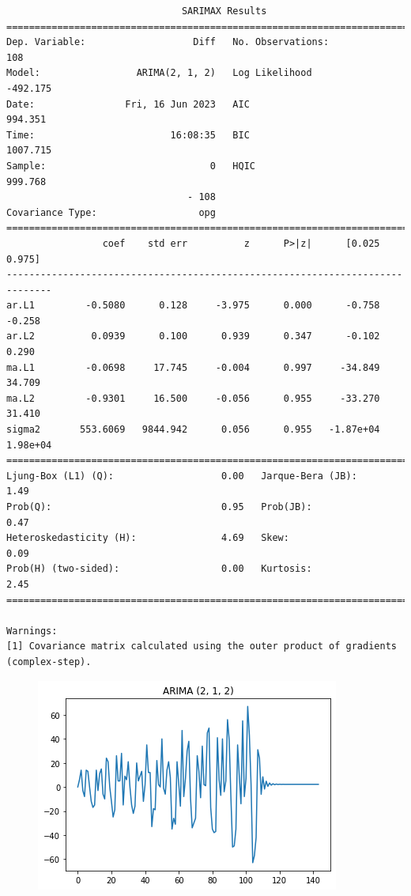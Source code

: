 \documentclass[
  letterpaper,
  DIV=11,
  numbers=noendperiod]{scrartcl}
\begin{document}
\begin{verbatim}
                               SARIMAX Results                                
==============================================================================
Dep. Variable:                   Diff   No. Observations:                  108
Model:                 ARIMA(2, 1, 2)   Log Likelihood                -492.175
Date:                Fri, 16 Jun 2023   AIC                            994.351
Time:                        16:08:35   BIC                           1007.715
Sample:                             0   HQIC                           999.768
                                - 108                                         
Covariance Type:                  opg                                         
==============================================================================
                 coef    std err          z      P>|z|      [0.025      0.975]
------------------------------------------------------------------------------
ar.L1         -0.5080      0.128     -3.975      0.000      -0.758      -0.258
ar.L2          0.0939      0.100      0.939      0.347      -0.102       0.290
ma.L1         -0.0698     17.745     -0.004      0.997     -34.849      34.709
ma.L2         -0.9301     16.500     -0.056      0.955     -33.270      31.410
sigma2       553.6069   9844.942      0.056      0.955   -1.87e+04    1.98e+04
===================================================================================
Ljung-Box (L1) (Q):                   0.00   Jarque-Bera (JB):                 1.49
Prob(Q):                              0.95   Prob(JB):                         0.47
Heteroskedasticity (H):               4.69   Skew:                             0.09
Prob(H) (two-sided):                  0.00   Kurtosis:                         2.45
===================================================================================

Warnings:
[1] Covariance matrix calculated using the outer product of gradients (complex-step).
\end{verbatim}

\begin{figure}[H]

{\centering \includegraphics{main_files/figure-pdf/cell-21-output-2.png}

}

\end{figure}
\end{document}
